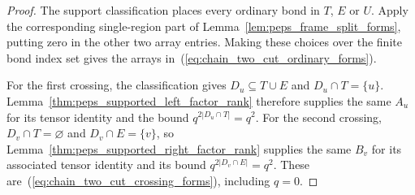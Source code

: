 \begin{proof}\leanok
    The support classification places every ordinary bond in $T$, $E$ or
    $U$. Apply the corresponding single-region part of
    Lemma~\ref{lem:peps_frame_split_forms}, putting zero in the other two
    array entries. Making these choices over the finite bond index set gives
    the arrays in~(\ref{eq:chain_two_cut_ordinary_forms}).

    For the first crossing, the classification gives
    $D_u\subseteq T\cup E$ and $D_u\cap T=\{u\}$.
    Lemma~\ref{thm:peps_supported_left_factor_rank} therefore supplies
    the same $A_u$ for its tensor identity and the bound
    $q^{2|D_u\cap T|}=q^2$.
    For the second crossing, $D_v\cap T=\varnothing$ and
    $D_v\cap E=\{v\}$, so
    Lemma~\ref{thm:peps_supported_right_factor_rank} supplies the same
    $B_v$ for its associated tensor identity and its bound
    $q^{2|D_v\cap E|}=q^2$.
    These are~(\ref{eq:chain_two_cut_crossing_forms}), including $q=0$.
\end{proof}

